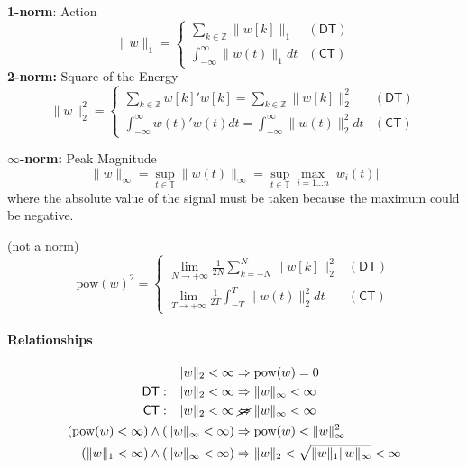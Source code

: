 \textbf{1-norm}: Action
\noindent\begin{equation*}
    \|w\|_1=\begin{cases}
        \sum\limits_{k\in\mathbb{Z}}\|w[k]\|_1 & (\mathsf{DT}) \\
        \int_{-\infty}^\infty\|w(t)\|_1 dt     & (\mathsf{CT})
    \end{cases}
\end{equation*}
\newpar{}
\textbf{2-norm:} Square of the Energy
\noindent\begin{equation*}
    \|w\|_2^2=
    \begin{cases}
        \sum\limits_{k\in\mathbb{Z}}w[k]'w[k] = \sum\limits_{k\in\mathbb{Z}}\|w[k]\|_2^2 & \mathsf{(DT)} \\
        \int_{-\infty}^\infty w(t)'w(t) dt = \int_{-\infty}^\infty\|w(t)\|_2^2 dt        & \mathsf{(CT)}
    \end{cases}
\end{equation*}

\newpar{}
\textbf{$\infty$-norm:} Peak Magnitude
\noindent\begin{equation*}
    \|w\|_\infty=\sup_{t\in\mathbb{T}}\|w(t)\|_\infty=\sup_{t\in\mathbb{T}}\max_{i=1\ldots n}|w_i(t)|
\end{equation*}
where the absolute value of the signal must be taken because the maximum could be negative.

 (not a norm)
\noindent\begin{equation*}
    \mathrm{pow}{(w)}^2=
    \begin{cases}
        \lim\limits_{N\to+\infty}\frac{1}{2N}\sum\limits_{k=-N}^N\|w[k]\|_2^2 & \mathsf{(DT)} \\
        \lim\limits_{T\to+\infty}\frac{1}{2T}\int_{-T}^T\|w(t)\|_2^2 dt       & \mathsf{(CT)}
    \end{cases}
\end{equation*}

\paragraph{Relationships}
\noindent\begin{align*}
    \|w\|_2<\infty                                         & \Rightarrow \mathrm{pow}{(w)}=0                         \\
    \mathsf{DT}:\;\;\|w\|_2<\infty                         & \Rightarrow \|w\|_\infty<\infty                         \\
    \mathsf{CT}:\;\;\|w\|_2<\infty                         & \;\cancel{\Leftrightarrow}\; \|w\|_\infty<\infty        \\
    (\mathrm{pow}{(w)}<\infty) \land (\|w\|_\infty<\infty) & \Rightarrow \mathrm{pow}{(w)} < \|w\|_\infty^2          \\
    (\|w\|_1<\infty) \land (\|w\|_\infty<\infty)           & \Rightarrow \|w\|_2<\sqrt{\|w\|_1\|w\|_\infty} < \infty
\end{align*}

